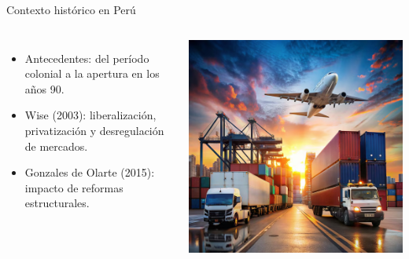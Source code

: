 \documentclass[aspectratio=169]{beamer}
\begin{document}
\begin{frame}{\Large Contexto histórico en Perú}
    \begin{columns}
            \raggedleft %
            \Large
            \begin{itemize}
                \item Antecedentes: del período colonial a la apertura en los años 90.
                \item Wise (2003): liberalización, privatización y desregulación de mercados.
                \item Gonzales de Olarte (2015): impacto de reformas estructurales.
            \end{itemize}
            \includegraphics[width=\textwidth]{./images/antecedentes.png} %
    \end{columns}
\end{frame}
\end{document}
